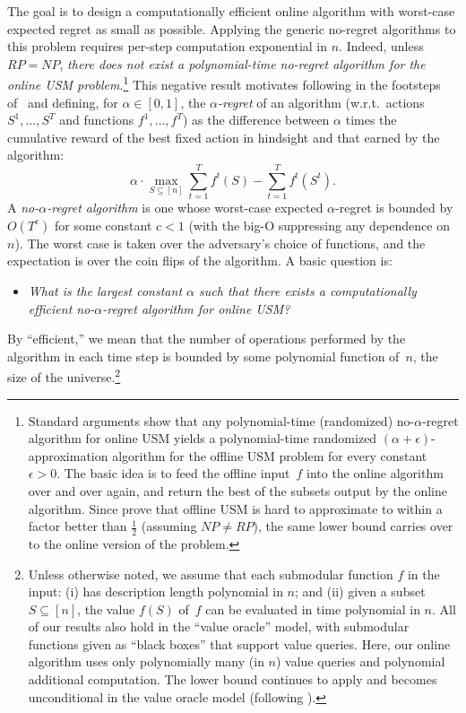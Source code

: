 \documentclass[final,12pt]{colt2018}
\newcommand{\sse}{\subseteq}
\newcommand{\nar}{no-$\alpha$-regret\xspace}
\begin{document}
The goal is to design a computationally efficient online algorithm
with worst-case expected regret as small as possible.
Applying the generic no-regret algorithms to this problem requires
per-step computation exponential in $n$.
Indeed, unless $RP=NP$, {\em there does not exist a polynomial-time
  no-regret algorithm for the online USM problem}.\footnote{Standard
  arguments show that any
polynomial-time (randomized) \nar algorithm for online USM
yields a polynomial-time randomized
$(\alpha+\epsilon)$-approximation algorithm for the offline USM
problem for every constant $\epsilon > 0$.  The basic idea is to feed
the offline input~$f$ into the online algorithm over and over again,
and return the best of the subsets output by the online
algorithm.  
Since \cite{DV12} prove that offline
USM is hard to approximate to within a factor better than $\tfrac
12$ (assuming $NP \neq RP$), the same lower bound carries over to the
online version of the problem.} 
This negative result motivates
following in the footsteps of~\cite{KKL09} and defining, for $\alpha
\in [0,1]$,
the {\em $\alpha$-regret} of an algorithm (w.r.t.\ actions
$S^1,\ldots,S^T$ and functions $f^1,\ldots,f^T$) as
the difference between 
$\alpha$ times the cumulative reward of the best fixed action in hindsight
and that earned by the algorithm:
\begin{equation}\label{eq:alpha}
\alpha \cdot \max_{S \sse [n]} \sum_{t=1}^T f^t(S)
- \sum_{t=1}^T f^t(S^t).
\end{equation}
A {\em no-$\alpha$-regret algorithm} is one whose worst-case
expected $\alpha$-regret is bounded by $O(T^c)$ for some constant $c < 1$
(with the big-O suppressing any dependence on $n$).
The worst case is taken over the adversary's choice of functions, and
the expectation is over the coin flips of the algorithm.
A basic question is:
\begin{itemize}

\item [] {\em What is the largest constant $\alpha$ such that there exists a
computationally  efficient no-$\alpha$-regret algorithm for online USM?}

\end{itemize}
By ``efficient,'' we mean that the number of operations performed by
the algorithm in each time step is bounded by some polynomial function
of~$n$, the size of the universe.\footnote{Unless otherwise noted, we
  assume that each submodular function $f$ in the input: (i) has
  description length polynomial in $n$; and (ii) given a subset $S
  \sse [n]$, the value $f(S)$ of~$f$ can be evaluated in
  time polynomial in $n$.  All of our results also hold in the ``value
  oracle'' model, with submodular functions given as ``black boxes''
  that support value queries.  Here, our online algorithm uses only
  polynomially many (in $n$) value queries and polynomial additional
  computation.  The lower bound continues to apply and becomes
  unconditional in the value oracle model (following \cite{FMV11}).}
\end{document}
